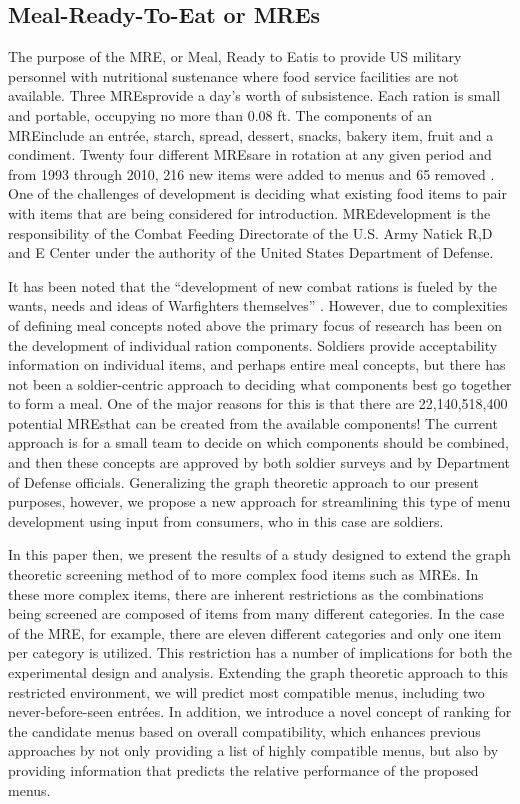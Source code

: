 \subsection{Meal-Ready-To-Eat or MREs}

The purpose of the MRE\tm, or Meal, Ready to Eat\tm is to provide US military personnel with nutritional sustenance where food service facilities are not available.  Three MREs\tm provide a day’s worth of subsistence.  Each ration is small and portable, occupying no more than 0.08 ft.   The components of an MRE\tm include an entr\'{e}e, starch, spread, dessert, snacks, bakery item, fruit and a condiment.  Twenty four different MREs\tm are in rotation at any given period and from 1993 through 2010, 216 new items were added to menus and 65 removed \citep{RDECOM2010}.  One of the challenges of development is deciding what existing food items to pair with items that are being considered for introduction.  MRE\tm development is the responsibility of the Combat Feeding Directorate of the U.S. Army Natick R,D and E Center under the authority of the United States Department of Defense.

It has been noted that the “development of new combat rations is fueled by the wants, needs and ideas of Warfighters themselves” \citep{RDECOM2010}.  However, due to complexities of defining meal concepts noted above the primary focus of research has been on the development of individual ration components.  Soldiers provide acceptability information on individual items, and perhaps entire meal concepts, but there has not been a soldier-centric approach to deciding what components best go together to form a meal.  One of the major reasons for this is that there are 22,140,518,400 potential MREs\tm that can be created from the available components!  The current approach is for a small team to decide on which components should be combined, and then these concepts are approved by both soldier surveys and by Department of Defense officials.  Generalizing the graph theoretic approach to our present purposes, however, we propose a new approach for streamlining this type of menu development using input from consumers, who in this case are soldiers.

In this paper then, we present the results of a study designed to extend the graph theoretic screening method of \citet{Ennisa} to more complex food items such as MREs\tm.  In these more complex items, there are inherent restrictions as the combinations being screened are composed of items from many different categories.  In the case of the MRE\tm, for example,  there are eleven different categories and only one item per category is utilized. This restriction has a number of implications for both the experimental design and analysis.  Extending the graph theoretic approach to this restricted environment, we will predict most compatible menus, including two never-before-seen entr\'{e}es.  In addition, we introduce a novel concept of ranking for the candidate menus based on overall compatibility, which enhances previous approaches by not only providing a list of highly compatible menus, but also by providing information that predicts the relative performance of the proposed menus.  

